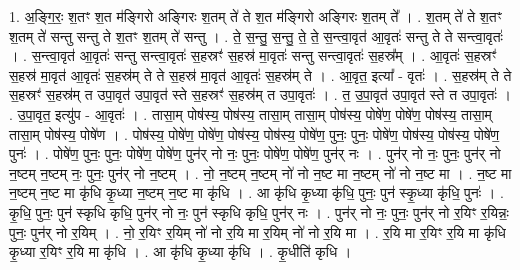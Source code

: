 \documentclass[17pt]{extarticle}
\begin{document}
1. अ॒ङ्गि॒रः॒ श॒तꣳ श॒त म॑ङ्गिरो अङ्गिरः श॒तम् ते॑ ते श॒त म॑ङ्गिरो अङ्गिरः श॒तम् ते᳚ । . श॒तम् ते॑ ते श॒तꣳ श॒तम् ते॑ सन्तु सन्तु ते श॒तꣳ श॒तम् ते॑ सन्तु । . ते॒ स॒न्तु॒ स॒न्तु॒ ते॒ ते॒ स॒न्त्वा॒वृत॑ आ॒वृतः॑ सन्तु ते ते सन्त्वा॒वृतः॑ । . स॒न्त्वा॒वृत॑ आ॒वृतः॑ सन्तु सन्त्वा॒वृतः॑ स॒हस्रꣳ॑ स॒हस्र॑ मा॒वृतः॑ सन्तु सन्त्वा॒वृतः॑ स॒हस्र᳚म् । . आ॒वृतः॑ स॒हस्रꣳ॑ स॒हस्र॑ मा॒वृत॑ आ॒वृतः॑ स॒हस्र॑म् ते ते स॒हस्र॑ मा॒वृत॑ आ॒वृतः॑ स॒हस्र॑म् ते । . आ॒वृत॒ इत्या᳚ - वृतः॑ । . स॒हस्र॑म् ते ते स॒हस्रꣳ॑ स॒हस्र॑म् त उपा॒वृत॑ उपा॒वृत॑ स्ते स॒हस्रꣳ॑ स॒हस्र॑म् त उपा॒वृतः॑ । . त॒ उ॒पा॒वृत॑ उपा॒वृत॑ स्ते त उपा॒वृतः॑ । . उ॒पा॒वृत॒ इत्यु॑प - आ॒वृतः॑ । . तासा॒म् पोष॑स्य॒ पोष॑स्य॒ तासा॒म् तासा॒म् पोष॑स्य॒ पोषे॑ण॒ पोषे॑ण॒ पोष॑स्य॒ तासा॒म् तासा॒म् पोष॑स्य॒ पोषे॑ण । . पोष॑स्य॒ पोषे॑ण॒ पोषे॑ण॒ पोष॑स्य॒ पोष॑स्य॒ पोषे॑ण॒ पुनः॒ पुनः॒ पोषे॑ण॒ पोष॑स्य॒ पोष॑स्य॒ पोषे॑ण॒ पुनः॑ । . पोषे॑ण॒ पुनः॒ पुनः॒ पोषे॑ण॒ पोषे॑ण॒ पुन॑र् नो नः॒ पुनः॒ पोषे॑ण॒ पोषे॑ण॒ पुन॑र् नः । . पुन॑र् नो नः॒ पुनः॒ पुन॑र् नो न॒ष्टम् न॒ष्टम् नः॒ पुनः॒ पुन॑र् नो न॒ष्टम् । . नो॒ न॒ष्टम् न॒ष्टम् नो॑ नो न॒ष्ट मा न॒ष्टम् नो॑ नो न॒ष्ट मा । . न॒ष्ट मा न॒ष्टम् न॒ष्ट मा कृ॑धि कृ॒ध्या न॒ष्टम् न॒ष्ट मा कृ॑धि । . आ कृ॑धि कृ॒ध्या कृ॑धि॒ पुनः॒ पुन॑ स्कृ॒ध्या कृ॑धि॒ पुनः॑ । . कृ॒धि॒ पुनः॒ पुन॑ स्कृधि कृधि॒ पुन॑र् नो नः॒ पुन॑ स्कृधि कृधि॒ पुन॑र् नः । . पुन॑र् नो नः॒ पुनः॒ पुन॑र् नो र॒यिꣳ र॒यिन्नः॒ पुनः॒ पुन॑र् नो र॒यिम् । . नो॒ र॒यिꣳ र॒यिम् नो॑ नो र॒यि मा र॒यिम् नो॑ नो र॒यि मा । . र॒यि मा र॒यिꣳ र॒यि मा कृ॑धि कृ॒ध्या र॒यिꣳ र॒यि मा कृ॑धि । . आ कृ॑धि कृ॒ध्या कृ॑धि । . कृ॒धीति॑ कृधि । \newline
\end{document}
